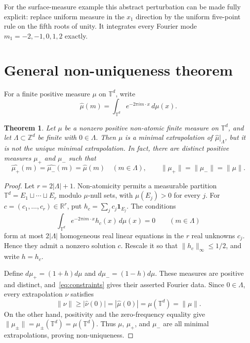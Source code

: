 \documentclass[11pt,a4paper]{article}
\newtheorem{theorem}{Theorem}
\newcommand{\T}{\mathbb{T}}
\newcommand{\Z}{\mathbb{Z}}
\begin{document}
For the surface-measure example this abstract perturbation can be made fully
explicit: replace uniform measure in the $x_1$ direction by the uniform
five-point rule on the fifth roots of unity.  It integrates every Fourier mode
$m_1=-2,-1,0,1,2$ exactly.

\section{General non-uniqueness theorem}

For a finite positive measure $\mu$ on $\T^d$, write
\[
 \widehat\mu(m)=\int_{\T^d}e^{-2\pi i m\cdot x}\,d\mu(x).
\]

\begin{theorem}\label{thm:general}
Let $\mu$ be a nonzero positive non-atomic finite measure on $\T^d$, and let
$\Lambda\subset\Z^d$ be finite with $0\in\Lambda$.  Then $\mu$ is a minimal
extrapolation of $\widehat\mu|_\Lambda$, but it is not the unique minimal
extrapolation.  In fact, there are distinct positive measures $\mu_+$ and
$\mu_-$ such that
\[
 \widehat{\mu_+}(m)=\widehat{\mu_-}(m)=\widehat\mu(m)
 \quad(m\in\Lambda),
 \qquad
 \|\mu_+\|=\|\mu_-\|=\|\mu\|.
\]
\end{theorem}

\begin{proof}
Let $r=2|\Lambda|+1$.  Non-atomicity permits a measurable partition
$\T^d=E_1\sqcup\cdots\sqcup E_r$ modulo $\mu$-null sets, with
$\mu(E_j)>0$ for every $j$.  For $c=(c_1,\ldots,c_r)\in\mathbb{R}^r$, put
$h_c=\sum_jc_j\mathbf{1}_{E_j}$.  The conditions
\begin{equation}\label{eq:constraints}
 \int_{\T^d} e^{-2\pi i m\cdot x}h_c(x)\,d\mu(x)=0
 \qquad(m\in\Lambda)
\end{equation}
form at most $2|\Lambda|$ homogeneous real linear equations in the $r$
real unknowns $c_j$.  Hence they admit a nonzero solution $c$.  Rescale it so
that $\|h_c\|_\infty\le 1/2$, and write $h=h_c$.

Define $d\mu_+=(1+h)d\mu$ and $d\mu_-=(1-h)d\mu$.  These measures are
positive and distinct, and~\eqref{eq:constraints} gives their asserted Fourier
data.  Since $0\in\Lambda$, every extrapolation $\nu$ satisfies
\[
 \|\nu\|\ge |\widehat\nu(0)|
   =|\widehat\mu(0)|=\mu(\T^d)=\|\mu\|.
\]
On the other hand, positivity and the zero-frequency equality give
$\|\mu_\pm\|=\mu_\pm(\T^d)=\mu(\T^d)$.  Thus $\mu$, $\mu_+$, and $\mu_-$
are all minimal extrapolations, proving non-uniqueness.
\end{proof}
\end{document}

